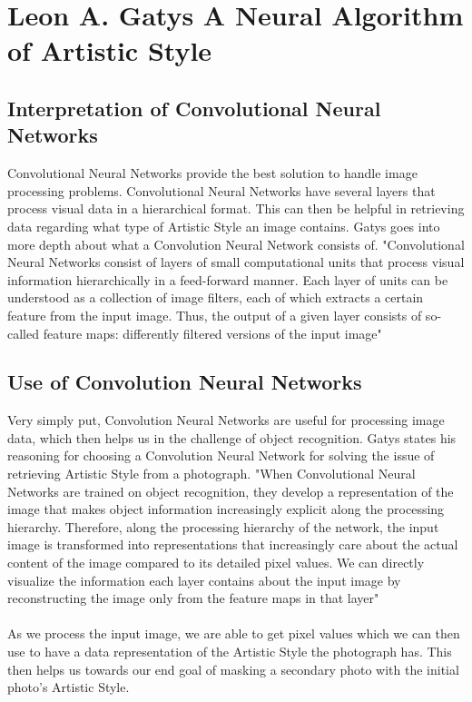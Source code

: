 \documentclass[12pt]{article}
\begin{document}
\section{Leon A. Gatys  A Neural Algorithm of Artistic Style}
\subsection{Interpretation of Convolutional Neural Networks}
Convolutional Neural Networks provide the best solution to handle image processing problems. Convolutional Neural Networks have several layers that process visual data in a hierarchical format.
This can then be helpful in retrieving data regarding what type of Artistic Style an image contains. Gatys goes into more depth about what a Convolution Neural Network consists of.
"Convolutional Neural Networks consist of layers of
small computational units that process visual information hierarchically in a feed-forward manner.
 Each layer of units can be understood as a collection of image filters, each of which
extracts a certain feature from the input image. Thus, the output of a given layer consists of
so-called feature maps: differently filtered versions of the input image" \cite{Gatys}

\subsection{Use of Convolution Neural Networks}
Very simply put, Convolution Neural Networks are useful for processing image data, which then helps us in the challenge of object recognition. 
Gatys states his reasoning for choosing a Convolution Neural Network for solving the issue of retrieving Artistic Style from a photograph. 
"When Convolutional Neural Networks are trained on object recognition, they develop a
representation of the image that makes object information increasingly explicit along the processing
hierarchy. Therefore, along the processing hierarchy of the network, the input image
is transformed into representations that increasingly care about the actual content of the image
compared to its detailed pixel values. We can directly visualize the information each layer
contains about the input image by reconstructing the image only from the feature maps in that
layer" \cite{Gatys} \\ \\
As we process the input image, we are able to get pixel values which we can then use to have a data representation of the Artistic Style the photograph has.
This then helps us towards our end goal of masking a secondary photo with the initial photo's Artistic Style. 
\end{document}
